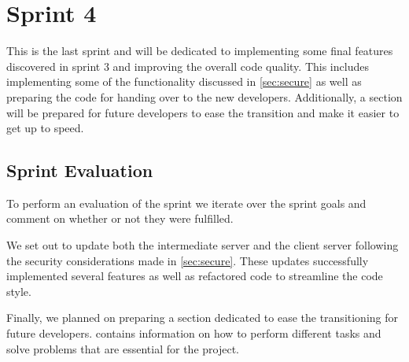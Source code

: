 \chapter{Sprint 4}
This is the last sprint and will be dedicated to implementing some final features discovered in sprint 3 and improving the overall code quality. This includes implementing some of the functionality discussed in \cref{sec:secure} as well as preparing the code for handing over to the new developers. Additionally, a section will be prepared for future developers to ease the transition and make it easier to get up to speed.







\section{Sprint Evaluation}
To perform an evaluation of the sprint we iterate over the sprint goals and comment on whether or not they were fulfilled.

We set out to update both the intermediate server and the client server following the security considerations made in \cref{sec:secure}. These updates successfully implemented several features as well as refactored code to streamline the code style.

Finally, we planned on preparing a section dedicated to ease the transitioning for future developers.  contains information on how to perform different tasks and solve problems that are essential for the project.